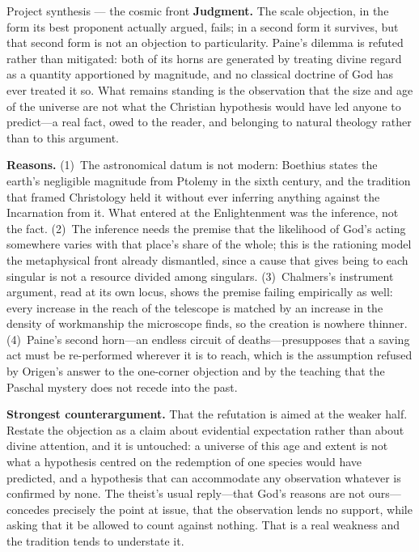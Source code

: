 \begin{studybox}{Project synthesis --- the cosmic front}
\textbf{Judgment.} The scale objection, in the form its best proponent actually argued, fails; in a second form it survives, but that second form is not an objection to particularity. Paine's dilemma is refuted rather than mitigated: both of its horns are generated by treating divine regard as a quantity apportioned by magnitude, and no classical doctrine of God has ever treated it so. What remains standing is the observation that the size and age of the universe are not what the Christian hypothesis would have led anyone to predict---a real fact, owed to the reader, and belonging to natural theology rather than to this argument.

\textbf{Reasons.} (1)~The astronomical datum is not modern: Boethius states the earth's negligible magnitude from Ptolemy in the sixth century, and the tradition that framed Christology held it without ever inferring anything against the Incarnation from it. What entered at the Enlightenment was the inference, not the fact. (2)~The inference needs the premise that the likelihood of God's acting somewhere varies with that place's share of the whole; this is the rationing model the metaphysical front already dismantled, since a cause that gives being to each singular is not a resource divided among singulars. (3)~Chalmers's instrument argument, read at its own locus, shows the premise failing empirically as well: every increase in the reach of the telescope is matched by an increase in the density of workmanship the microscope finds, so the creation is nowhere thinner. (4)~Paine's second horn---an endless circuit of deaths---presupposes that a saving act must be re-performed wherever it is to reach, which is the assumption refused by Origen's answer to the one-corner objection and by the teaching that the Paschal mystery does not recede into the past.

\textbf{Strongest counterargument.} That the refutation is aimed at the weaker half. Restate the objection as a claim about evidential expectation rather than about divine attention, and it is untouched: a universe of this age and extent is not what a hypothesis centred on the redemption of one species would have predicted, and a hypothesis that can accommodate any observation whatever is confirmed by none. The theist's usual reply---that God's reasons are not ours---concedes precisely the point at issue, that the observation lends no support, while asking that it be allowed to count against nothing. That is a real weakness and the tradition tends to understate it.


\end{studybox}
